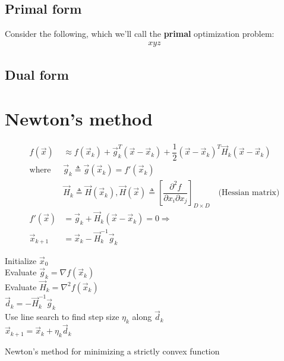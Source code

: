 \subsection{Primal form}
Consider the following, which we'll call the \textbf{primal} optimization problem:
\begin{eqnarray}
xyz
\end{eqnarray}


\subsection{Dual form}


\section{Newton's method}
\label{sec:Newtons-method}
\begin{align}
f(\vec{x})& \approx f(\vec{x}_k)+\vec{g}_k^T(\vec{x}-\vec{x}_k)+\dfrac{1}{2}(\vec{x}-\vec{x}_k)^T\vec{H}_k(\vec{x}-\vec{x}_k) \nonumber \\
\text{where } & \vec{g}_k \triangleq \vec{g}(\vec{x}_k)=f'(\vec{x}_k) \nonumber \\
              & \vec{H}_k \triangleq \vec{H}(\vec{x}_k), \vec{H}(\vec{x}) \triangleq \left[\dfrac{\partial^2 f}{\partial x_i \partial x_j}\right]_{D \times D} \quad \text{(Hessian matrix)} \nonumber \\
f'(\vec{x})& = \vec{g}_k+\vec{H}_k(\vec{x}-\vec{x}_k)=0 \Rightarrow  \label{eqn:newton-stationary-point} \\
\vec{x}_{k+1}& = \vec{x}_k-\vec{H}_k^{-1}\vec{g}_k
\end{align}

\begin{algorithm}[htbp]
    Initialize $\vec{x}_0$ \\
	
	 {
        Evaluate $\vec{g}_k=\nabla f(\vec{x}_k)$ \\
        Evaluate $\vec{H}_k=\nabla^2 f(\vec{x}_k)$ \\
        $\vec{d}_k=-\vec{H}_k^{-1}\vec{g}_k$ \\
        Use line search to find step size $\eta_k$ along $\vec{d}_k$ \\
        $\vec{x}_{k+1}=\vec{x}_k+\eta_k\vec{d}_k$
	}
	
\caption{Newton’s method for minimizing a strictly convex function}
\end{algorithm}


